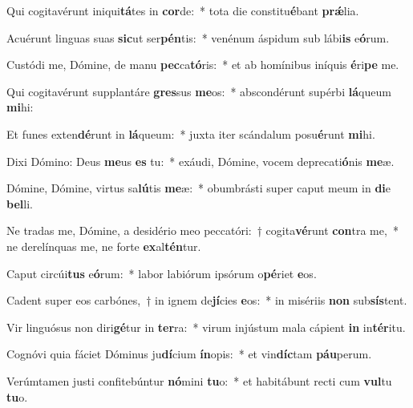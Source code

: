 \item Qui cogitavérunt iniqui\textbf{tá}tes in \textbf{cor}de:~* tota die constitu\textbf{é}bant \textbf{prǽ}lia.
\item Acuérunt linguas suas \textbf{sic}ut ser\textbf{pén}tis:~* venénum áspidum sub lábi\textbf{is} e\textbf{ó}rum.
\item Custódi me, Dómine, de manu \textbf{pec}ca\textbf{tó}ris:~* et ab homínibus iníquis \textbf{é}ri\textbf{pe} me.
\item Qui cogitavérunt supplantáre \textbf{gres}sus \textbf{me}os:~* abscondérunt supérbi \textbf{lá}queum \textbf{mi}hi:
\item Et funes exten\textbf{dé}runt in \textbf{lá}queum:~* juxta iter scándalum posu\textbf{é}runt \textbf{mi}hi.
\item Dixi Dómino: Deus \textbf{me}us \textbf{es} tu:~* exáudi, Dómine, vocem deprecati\textbf{ó}nis \textbf{me}æ.
\item Dómine, Dómine, virtus sa\textbf{lú}tis \textbf{me}æ:~* obumbrásti super caput meum in \textbf{di}e \textbf{bel}li.
\item Ne tradas me, Dómine, a desidério meo peccatóri:~† cogita\textbf{vé}runt \textbf{con}tra me,~* ne derelínquas me, ne forte \textbf{ex}al\textbf{tén}tur.
\item Caput circúi\textbf{tus} e\textbf{ó}rum:~* labor labiórum ipsórum o\textbf{pé}riet \textbf{e}os.
\item Cadent super eos carbónes,~† in ignem de\textbf{jí}cies \textbf{e}os:~* in misériis \textbf{non} sub\textbf{sís}tent.
\item Vir linguósus non diri\textbf{gé}tur in \textbf{ter}ra:~* virum injústum mala cápient \textbf{in} in\textbf{tér}itu.
\item Cognóvi quia fáciet Dóminus ju\textbf{dí}cium \textbf{ín}opis:~* et vin\textbf{díc}tam \textbf{páu}perum.
\item Verúmtamen justi confitebúntur \textbf{nó}mini \textbf{tu}o:~* et habitábunt recti cum \textbf{vul}tu \textbf{tu}o.
